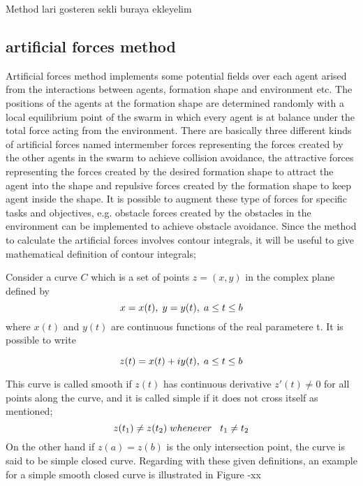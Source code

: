 \documentclass[twoside]{article}
\begin{document}
\begin{multicols}{2}
		Method lari gosteren sekli buraya ekleyelim
		
		
		\subsection{artificial forces method}
		Artificial forces method implements some potential fields over each agent arised from the interactions between agents, formation shape and environment etc. The positions of the agents at the formation shape  are determined randomly with a local equilibrium point of the swarm in which every agent is at balance under the total force acting from the environment. There are basically three different kinds of artificial forces named intermember forces representing the forces created by the other agents in the swarm to achieve collision avoidance, the attractive forces representing the forces created by the desired formation shape to attract the agent into the shape and repulsive forces created by the formation shape to keep agent inside the shape. It is possible to augment these type of forces for specific tasks and objectives, e.g. obstacle forces created by the obstacles in the environment can be implemented to achieve obstacle avoidance.
		Since the method to calculate the artificial forces involves contour integrals, it will be useful to give mathematical definition of contour integrals;
		
		Consider a curve $C$ which is a set of points $z = (x,y)$ in the complex plane defined by
		\begin{equation}
x = x(t),   \hspace{0.1cm} y = y(t),  \hspace{0.1cm} a\leq t \leq b
		\end{equation}
		where $x(t)$ and $y(t)$ are continuous functions of the real parametere t.  It is possible to write
		
		\begin{equation}
z(t) = x(t)+iy(t),   \hspace{0.1cm} a\leq t \leq b
		\end{equation}
		
		This curve is called smooth if $z(t)$ has continuous derivative $z'(t) \neq 0$ for all points along the curve, and it is called simple if it does not cross itself as mentioned;
		\begin{equation}
z(t_1) \neq z(t_2)   \hspace{0.1cm} whenever   \hspace{0.3cm} t_1\neq t_2
		\end{equation}
		On the other hand if  $z(a)=z(b)$ is the only intersection point, the curve is said to be simple closed curve. Regarding with these given definitions, an example for a  simple smooth closed curve is illustrated in Figure -xx
		

\end{multicols}
\end{document}
